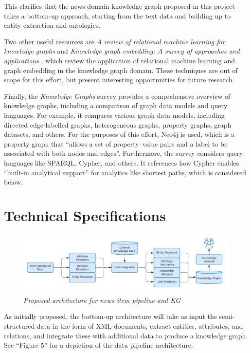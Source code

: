 \documentclass[11pt]{article}
\begin{document}
  This clarifies that the news domain knowledge graph proposed in this project takes a bottom-up approach, starting from the text data and building up to entity extraction and ontologies.

  Two other useful resources are \textit{A review of relational machine learning for knowledge graphs} \cite{nickel2015review} and \textit{Knowledge graph embedding: A survey of approaches and applications} \cite{wang2017knowledge}, which review the application of relational machine learning and graph embedding in the knowledge graph domain. These techniques are out of scope for this effort, but present interesting opportunities for future research.

  Finally, the \textit{Knowledge Graphs} survey\cite{hogan2021knowledge} provides a comprehensive overview of knowledge graphs, including a comparison of graph data models and query languages. For example, it compares various graph data models, including directed edge-labelled graphs, heterogeneous graphs, property graphs, graph datasets, and others. For the purposes of this effort, Neo4j is used, which is a property graph that ``allows a set of property–value pairs and a label to be associated with both nodes and edges''. Furthermore, the survey considers query languages like SPARQL, Cypher, and others. It references how Cypher enables ``built-in analytical support'' for analytics like shortest paths, which is considered below.

\section{Technical Specifications}

  \begin{figure}
  \centerline{\includegraphics[scale=0.275]{bottom-up-kg-architecture}}
  \caption{\textit{Proposed architecture for news item pipeline and KG}}
  \label{figure:BottomUpKGArchitecture}
  \end{figure}

  As initially proposed\cite{ek-proposal}, the bottom-up architecture will take as input the semi-structured data in the form of XML documents, extract entities, attributes, and relations, and integrate these with additional data to produce a knowledge graph. See ``Figure 5'' for a depiction of the data pipeline architecture.
\end{document}
